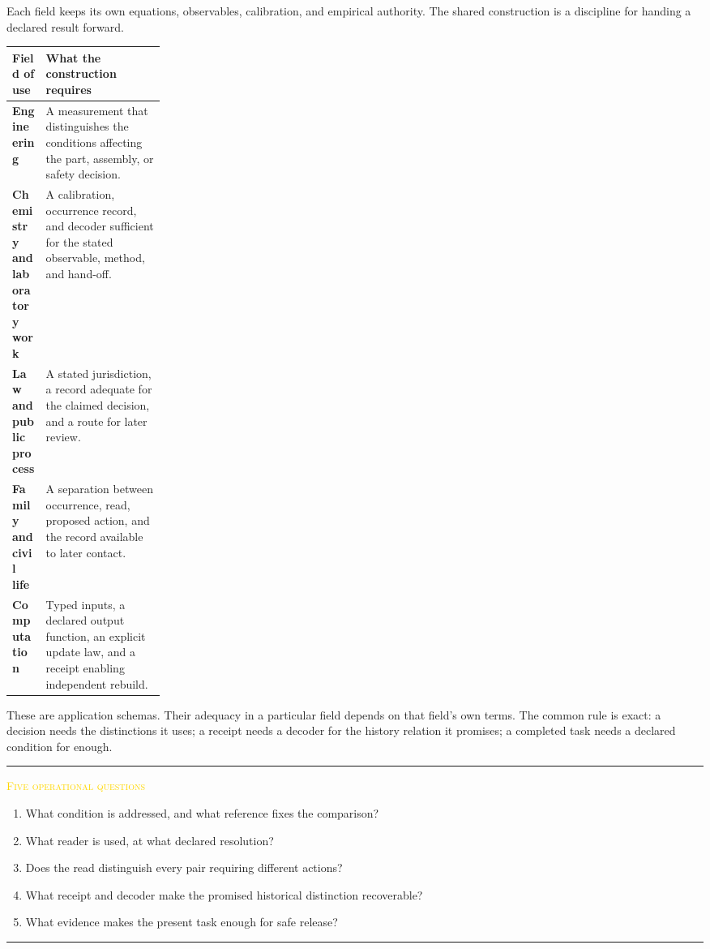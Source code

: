 \documentclass[11pt]{article}
\newcommand{\smallcaps}[1]{{\footnotesize\textsc{#1}}}
\newenvironment{claimbox}[1]{%
  \par\vspace{0.55em}\noindent\begin{minipage}{\linewidth}
  \color{line}\rule{\linewidth}{0.55pt}\par\vspace{0.34em}%
  \textcolor{gold}{\smallcaps{#1}}\par\vspace{0.3em}\color{ink}%
}{%
  \par\vspace{0.38em}\color{line}\rule{\linewidth}{0.55pt}%
  \end{minipage}\par\vspace{0.55em}%
}
\begin{document}
Each field keeps its own equations, observables, calibration, and empirical authority. The shared construction is a discipline for handing a declared result forward.

\begin{center}
\begin{tabularx}{\linewidth}{@{}>{\bfseries}p{0.22\linewidth}Y@{}}
\toprule
Field of use & What the construction requires \\
\midrule
Engineering & A measurement that distinguishes the conditions affecting the part, assembly, or safety decision. \\
Chemistry and laboratory work & A calibration, occurrence record, and decoder sufficient for the stated observable, method, and hand-off. \\
Law and public process & A stated jurisdiction, a record adequate for the claimed decision, and a route for later review. \\
Family and civil life & A separation between occurrence, read, proposed action, and the record available to later contact. \\
Computation & Typed inputs, a declared output function, an explicit update law, and a receipt enabling independent rebuild. \\
\bottomrule
\end{tabularx}
\end{center}

These are application schemas. Their adequacy in a particular field depends on that field's own terms. The common rule is exact: a decision needs the distinctions it uses; a receipt needs a decoder for the history relation it promises; a completed task needs a declared condition for enough.

\begin{claimbox}{Five operational questions}
\begin{enumerate}
  \item What condition is addressed, and what reference fixes the comparison?
  \item What reader is used, at what declared resolution?
  \item Does the read distinguish every pair requiring different actions?
  \item What receipt and decoder make the promised historical distinction recoverable?
  \item What evidence makes the present task enough for safe release?
\end{enumerate}
\end{claimbox}
\end{document}

